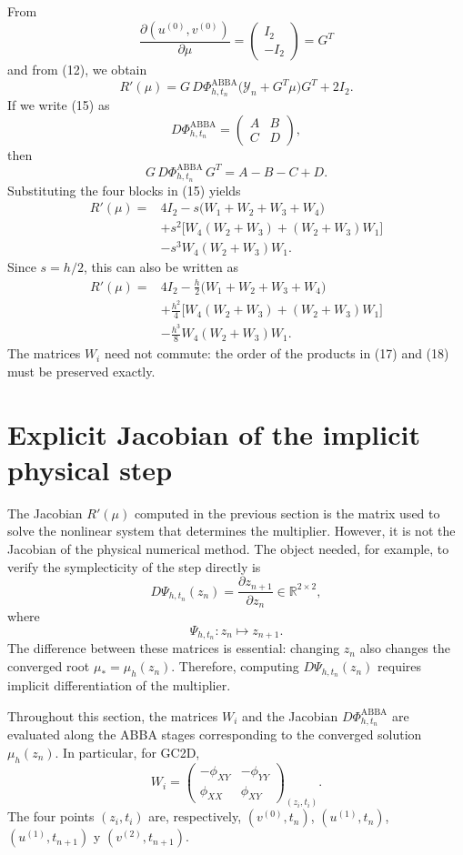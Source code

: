 \documentclass[11pt,a4paper]{article}
\newcommand{\R}{\mathbb{R}}
\newcommand{\Id}{I}
\newcommand{\Y}{\mathcal{Y}}
\newcommand{\PhiAB}{\Phi^{\mathrm{ABBA}}_{h,t_n}}
\begin{document}
From
\[
 \frac{\partial(u^{(0)},v^{(0)})}{\partial\mu}
 =\begin{pmatrix}\Id_2\\-\Id_2\end{pmatrix}=G^T
\]
and from (12), we obtain
\[
 \boxed{
 R'(\mu)=G\,D\PhiAB\bigl(\Y_n+G^T\mu\bigr)G^T+2\Id_2.
 } \tag{16}
\]
If we write (15) as
\[
 D\PhiAB=
 \begin{pmatrix}A&B\\C&D\end{pmatrix},
\]
then
\[
 G\,D\PhiAB\,G^T=A-B-C+D.
\]
Substituting the four blocks in (15) yields
\[
 \boxed{
 \begin{aligned}
 R'(\mu)={}&4\Id_2
 -s\bigl(W_1+W_2+W_3+W_4\bigr)\\
 &+s^2\bigl[W_4(W_2+W_3)+(W_2+W_3)W_1\bigr]\\
 &-s^3W_4(W_2+W_3)W_1.
 \end{aligned}
 } \tag{17}
\]
Since $s=h/2$, this can also be written as
\[
 \boxed{
 \begin{aligned}
 R'(\mu)={}&4\Id_2
 -\frac h2\bigl(W_1+W_2+W_3+W_4\bigr)\\
 &+\frac{h^2}{4}
 \bigl[W_4(W_2+W_3)+(W_2+W_3)W_1\bigr]\\
 &-\frac{h^3}{8}W_4(W_2+W_3)W_1.
 \end{aligned}
 } \tag{18}
\]
The matrices $W_i$ need not commute: the order of the products in (17) and (18) must be
preserved exactly.

\section{Explicit Jacobian of the implicit physical step}

The Jacobian $R'(\mu)$ computed in the previous section is the matrix used to solve the
nonlinear system that determines the multiplier. However, it is not the Jacobian of the
physical numerical method. The object needed, for example, to verify the symplecticity of
the step directly is
\[
 D\Psi_{h,t_n}(z_n)
 =\frac{\partial z_{n+1}}{\partial z_n}\in\R^{2\times2},
\]
where
\[
 \Psi_{h,t_n}:z_n\longmapsto z_{n+1}.
\]
The difference between these matrices is essential: changing $z_n$ also changes the
converged root $\mu_*=\mu_h(z_n)$. Therefore, computing $D\Psi_{h,t_n}(z_n)$ requires
implicit differentiation of the multiplier.

Throughout this section, the matrices $W_i$ and the Jacobian $D\PhiAB$ are evaluated along
the ABBA stages corresponding to the converged solution $\mu_h(z_n)$. In particular, for
GC2D,
\[
 W_i=
 \begin{pmatrix}
  -\phi_{XY}&-\phi_{YY}\\
  \phi_{XX}&\phi_{XY}
 \end{pmatrix}_{(z_i,t_i)}.
\]
The four points $(z_i,t_i)$ are, respectively,
$(v^{(0)},t_n)$, $(u^{(1)},t_n)$, $(u^{(1)},t_{n+1})$ y
$(v^{(2)},t_{n+1})$.
\end{document}
